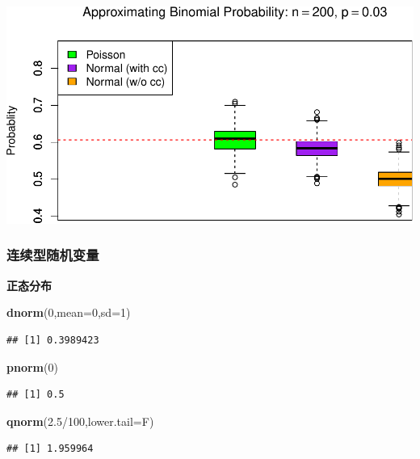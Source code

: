 \documentclass[]{article}
\newenvironment{Shaded}{\begin{snugshade}}{\end{snugshade}}
\newcommand{\KeywordTok}[1]{\textcolor[rgb]{0.13,0.29,0.53}{\textbf{{#1}}}}
\newcommand{\DataTypeTok}[1]{\textcolor[rgb]{0.13,0.29,0.53}{{#1}}}
\newcommand{\DecValTok}[1]{\textcolor[rgb]{0.00,0.00,0.81}{{#1}}}
\newcommand{\FloatTok}[1]{\textcolor[rgb]{0.00,0.00,0.81}{{#1}}}
\newcommand{\NormalTok}[1]{{#1}}
\begin{document}
\includegraphics{probability_files/figure-latex/unnamed-chunk-16-2.pdf}

\subsubsection{连续型随机变量}

\textbf{正态分布}

\begin{Shaded}
\begin{Highlighting}[]
\KeywordTok{dnorm}\NormalTok{(}\DecValTok{0}\NormalTok{,}\DataTypeTok{mean=}\DecValTok{0}\NormalTok{,}\DataTypeTok{sd=}\DecValTok{1}\NormalTok{)}
\end{Highlighting}
\end{Shaded}

\begin{verbatim}
## [1] 0.3989423
\end{verbatim}

\begin{Shaded}
\begin{Highlighting}[]
\KeywordTok{pnorm}\NormalTok{(}\DecValTok{0}\NormalTok{)}
\end{Highlighting}
\end{Shaded}

\begin{verbatim}
## [1] 0.5
\end{verbatim}

\begin{Shaded}
\begin{Highlighting}[]
\KeywordTok{qnorm}\NormalTok{(}\FloatTok{2.5}\NormalTok{/}\DecValTok{100}\NormalTok{,}\DataTypeTok{lower.tail=}\NormalTok{F)}
\end{Highlighting}
\end{Shaded}

\begin{verbatim}
## [1] 1.959964
\end{verbatim}
\end{document}
